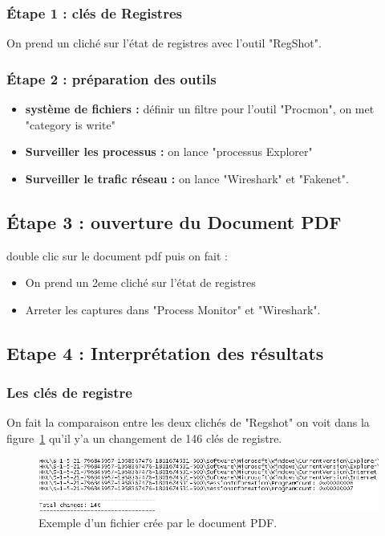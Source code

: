 \subsubsection*{Étape 1 : clés de Registres}
On prend un cliché sur l'état de registres avec l'outil "RegShot".
\subsubsection*{Étape 2 : préparation des outils}
\begin{itemize}
\item \textbf{système de fichiers : }définir un filtre pour l'outil "Procmon", on met "category is write"
\item \textbf{Surveiller les processus : }on lance "processus Explorer"
\item \textbf{Surveiller le trafic réseau : }on lance "Wireshark" et "Fakenet".
\end{itemize}
\subsection*{Étape 3 : ouverture du Document PDF} 
double clic sur le document pdf puis on fait :
\begin{itemize}
\item On prend un 2eme cliché sur l'état de registres
\item Arreter les captures dans "Process Monitor" et "Wireshark".
\end{itemize} 
\subsection*{Etape 4 : Interprétation des résultats}

\subsubsection*{Les clés de registre}
On fait la comparaison entre les deux clichés de "Regshot" on voit dans la figure~\ref{fig :anal9} qu'il y'a un changement de 146 clés de registre. 
\begin{figure}[H]
\begin{center}
\includegraphics[scale=0.7]{Figures/anal9.png}
\caption{Exemple d'un fichier crée par le document PDF.}
\label{fig :anal9} 
\end{center}
\end{figure}
